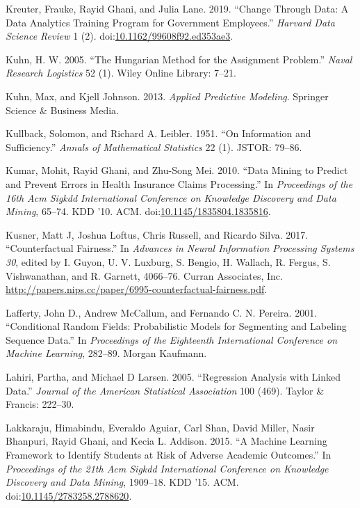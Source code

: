 \documentclass[]{krantz}
\begin{document}
\hypertarget{ref-Kreuter2019Change}{}
Kreuter, Frauke, Rayid Ghani, and Julia Lane. 2019. ``Change Through
Data: A Data Analytics Training Program for Government Employees.''
\emph{Harvard Data Science Review} 1 (2).
doi:\href{https://doi.org/10.1162/99608f92.ed353ae3}{10.1162/99608f92.ed353ae3}.

\hypertarget{ref-kuhn2005hungarian}{}
Kuhn, H. W. 2005. ``The Hungarian Method for the Assignment Problem.''
\emph{Naval Research Logistics} 52 (1). Wiley Online Library: 7--21.

\hypertarget{ref-KuhnJohnson2013}{}
Kuhn, Max, and Kjell Johnson. 2013. \emph{Applied Predictive Modeling}.
Springer Science \& Business Media.

\hypertarget{ref-kullback1951information}{}
Kullback, Solomon, and Richard A. Leibler. 1951. ``On Information and
Sufficiency.'' \emph{Annals of Mathematical Statistics} 22 (1). JSTOR:
79--86.

\hypertarget{ref-Kumar2010}{}
Kumar, Mohit, Rayid Ghani, and Zhu-Song Mei. 2010. ``Data Mining to
Predict and Prevent Errors in Health Insurance Claims Processing.'' In
\emph{Proceedings of the 16th Acm Sigkdd International Conference on
Knowledge Discovery and Data Mining}, 65--74. KDD '10. ACM.
doi:\href{https://doi.org/10.1145/1835804.1835816}{10.1145/1835804.1835816}.

\hypertarget{ref-kusner2017}{}
Kusner, Matt J, Joshua Loftus, Chris Russell, and Ricardo Silva. 2017.
``Counterfactual Fairness.'' In \emph{Advances in Neural Information
Processing Systems 30}, edited by I. Guyon, U. V. Luxburg, S. Bengio, H.
Wallach, R. Fergus, S. Vishwanathan, and R. Garnett, 4066--76. Curran
Associates, Inc.
\url{http://papers.nips.cc/paper/6995-counterfactual-fairness.pdf}.

\hypertarget{ref-lafferty-01}{}
Lafferty, John D., Andrew McCallum, and Fernando C. N. Pereira. 2001.
``Conditional Random Fields: Probabilistic Models for Segmenting and
Labeling Sequence Data.'' In \emph{Proceedings of the Eighteenth
International Conference on Machine Learning}, 282--89. Morgan Kaufmann.

\hypertarget{ref-lahiri2005regression}{}
Lahiri, Partha, and Michael D Larsen. 2005. ``Regression Analysis with
Linked Data.'' \emph{Journal of the American Statistical Association}
100 (469). Taylor \& Francis: 222--30.

\hypertarget{ref-Lakkaraju2015}{}
Lakkaraju, Himabindu, Everaldo Aguiar, Carl Shan, David Miller, Nasir
Bhanpuri, Rayid Ghani, and Kecia L. Addison. 2015. ``A Machine Learning
Framework to Identify Students at Risk of Adverse Academic Outcomes.''
In \emph{Proceedings of the 21th Acm Sigkdd International Conference on
Knowledge Discovery and Data Mining}, 1909--18. KDD '15. ACM.
doi:\href{https://doi.org/10.1145/2783258.2788620}{10.1145/2783258.2788620}.
\end{document}
